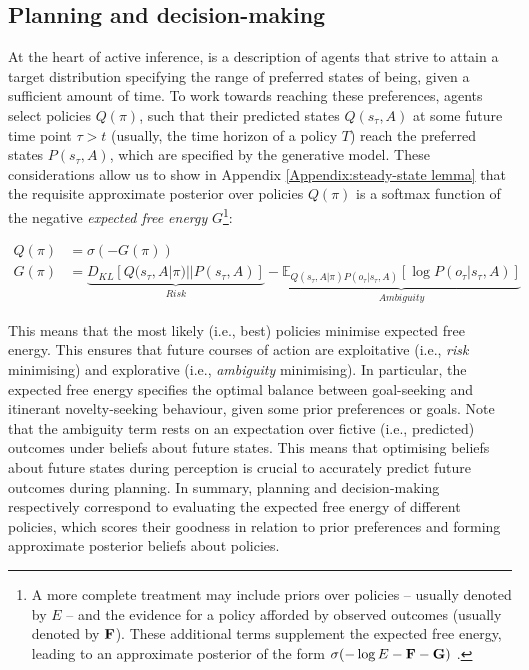 \documentclass{article}
\begin{document}
\subsection{Planning and decision-making}

At the heart of active inference, is a description of agents that strive to attain a target distribution specifying the range of preferred states of being, given a sufficient amount of time. To work towards reaching these preferences, agents select policies $Q(\pi)$, such that their predicted states $Q(s_\tau,A)$ at some future time point $\tau > t$ (usually, the time horizon of a policy $T$) reach the preferred states $P(s_\tau,A)$, which are specified by the generative model. These considerations allow us to show in Appendix \ref{Appendix:steady-state lemma} that the requisite approximate posterior over policies $Q(\pi)$ is a softmax function of the negative \textit{expected free energy} $G$\footnote{A more complete treatment may include priors over policies – usually denoted by $E$ – and the evidence for a policy afforded by observed outcomes (usually denoted by $\bold F$). These additional terms supplement the expected free energy, leading to an approximate posterior of the form $\sigma (- \log E - \bold F - \bold G)$ \cite{fristonDeepTemporalModels2018}.}:

\begin{equation}
\label{eq: approx post policies}
\begin{split}
   Q(\pi) &=\sigma(-G(\pi)) \\
   G(\pi) &= \underbrace{ D_{KL}[Q(s_\tau, A|\pi)||P(s_\tau, A)]}_{Risk}- \underbrace{\mathbb E_{Q(s_\tau, A|\pi)P(o_\tau|s_\tau, A)}[ \log P(o_\tau |s_\tau, A)]}_{Ambiguity}
\end{split}
\end{equation}

This means that the most likely (i.e., best) policies minimise expected free energy. This ensures that future courses of action are exploitative (i.e., \textit{risk} minimising) and explorative (i.e., \textit{ambiguity} minimising). In particular, the expected free energy specifies the optimal balance between goal-seeking and itinerant novelty-seeking behaviour, given some prior preferences or goals. Note that the ambiguity term rests on an expectation over fictive (i.e., predicted) outcomes under beliefs about future states. This means that optimising beliefs about future states during perception is crucial to accurately predict future outcomes during planning. In summary, planning and decision-making respectively correspond to evaluating the expected free energy of different policies, which scores their goodness in relation to prior preferences and forming approximate posterior beliefs about policies.
\end{document}

